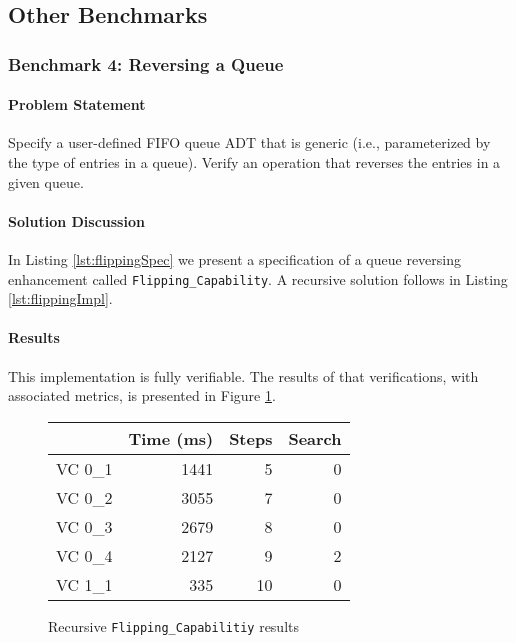\FloatBarrier
	\subsection{Other Benchmarks}

		\subsubsection{Benchmark 4: Reversing a Queue}	%

\paragraph{Problem Statement}Specify a user-defined FIFO queue ADT that is generic (i.e., parameterized by the type of entries in a queue). Verify an operation that reverses the entries in a given queue.

\paragraph{Solution Discussion}In Listing \ref{lst:flippingSpec} we present a specification of a queue reversing enhancement called \texttt{Flipping\_Capability}.  A recursive solution follows in Listing \ref{lst:flippingImpl}.






\paragraph{Results}This implementation is fully verifiable.  The results of that verifications, with associated metrics, is presented in Figure \ref{fig:flippingResults}.

\begin{figure}
	\centering
	\begin{tabular}{lrrr}
		\toprule
			& Time (ms)	& Steps	& Search \\
		\midrule
		VC 0\_1	& 1441		& 5 	& 0     \\
		VC 0\_2	& 3055		& 7 	& 0     \\
		VC 0\_3	& 2679		& 8 	& 0     \\
		VC 0\_4	& 2127		& 9 	& 2     \\
		VC 1\_1	& 335		& 10	& 0     \\
		\bottomrule
	\end{tabular}
	\caption{Recursive \texttt{Flipping\_Capabilitiy} results\label{fig:flippingResults}}
\end{figure}


